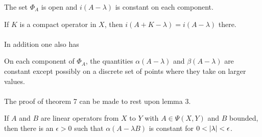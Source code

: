 \documentclass[11pt,twoside]{article}
\begin{document}
\begin{theorem1} %
The set $\Phi_A$ is open and $i(A-\lambda)$ is constant
on each component.
\end{theorem1}

\begin{theorem1} %
If $K$ is a compact operator in $X$,
then $i(A+K-\lambda) = i(A-\lambda)$ there.
\end{theorem1}

\paragraph*{}
In addition one also has

\begin{theorem1} %
On each component of $\Phi_A$,
the quantities
$\alpha(A - \lambda)$ and $\beta(A - \lambda)$ 
are constant except possibly on a discrete set of points
where they take on larger values.
\end{theorem1}

\paragraph*{}
The proof of theorem 7 can be made to rest upon lemma 3.

\begin{lemma} %
If $A$ and $B$ are linear operators from $X$ to $Y$
with $A \in \Psi(X,Y)$ and $B$ bounded,
then there is an $\epsilon > 0$
such that
$\alpha(A-\lambda B)$ is constant for $0 < \abs{\lambda} < \epsilon$.
\end{lemma}
\end{document}
